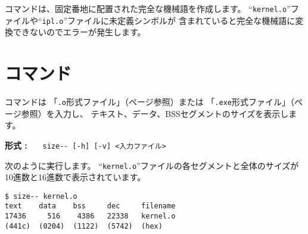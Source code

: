 {\objbin}コマンドは、固定番地に配置された完全な機械語を作成します。
``\verb/kernel.o/''ファイルや``\verb/ipl.o/''ファイルに未定義シンボルが
含まれていると完全な機械語に変換できないのでエラーが発生します。

%

\section{{\size}コマンド}

{\size}コマンドは
「\verb/.o/形式ファイル」（\pageref{app:oformat}ページ参照）または
「\verb/.exe/形式ファイル」（\pageref{app:eformat}ページ参照）を入力し、
テキスト、データ、BSSセグメントのサイズを表示します。

\begin{flushleft}
{\bf 形式 : }~~~\verb/size-- [-h] [-v] <入力ファイル>/
\end{flushleft}

次のように実行します。
``\verb/kernel.o/''ファイルの各セグメントと全体のサイズが
10進数と16進数で表示されています。

\begin{mylist}
\begin{verbatim}
$ size-- kernel.o
text    data    bss     dec     filename
17436     516    4386   22338   kernel.o
(441c)  (0204)  (1122)  (5742)  (hex)
\end{verbatim}
\end{mylist}
